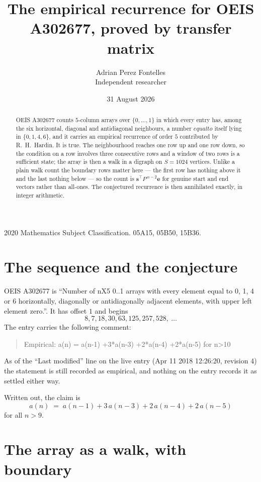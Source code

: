 \documentclass[11pt,a4paper]{article}
\title{The empirical recurrence for OEIS A302677, proved by transfer matrix}
\author{Adrian Perez Fontelles\\ \small Independent researcher}
\date{31 August 2026}
\theoremstyle{plain}
\theoremstyle{definition}
\begin{document}
\maketitle

\begin{abstract}
OEIS A302677 counts $5$-column arrays over $\{0,\dots,1\}$ in which every entry has,
among the six horizontal, diagonal and antidiagonal neighbours, a number $equal to$ itself lying in $\{0,1,4,6\}$, and it carries an empirical
recurrence of order $5$ contributed by R.~H.~Hardin. It is true. The neighbourhood
reaches one row up and one row down, so the condition on a row involves three consecutive
rows and a window of two rows is a sufficient state; the array is then a walk in a digraph
on $S=1024$ vertices. Unlike a plain walk count the boundary rows matter here --- the first
row has nothing above it and the last nothing below --- so the count is
$\mathbf{s}^{\!\top}P^{\,n-2}\mathbf{e}$ for genuine start and end vectors rather than
all-ones. The conjectured recurrence is then annihilated exactly, in integer arithmetic.
\end{abstract}

\noindent\small 2020 Mathematics Subject Classification. 05A15, 05B50, 15B36.\normalsize

\section{The sequence and the conjecture}

OEIS A302677 is ``Number of nX5 0..1 arrays with every element equal to 0, 1, 4 or 6 horizontally, diagonally or antidiagonally adjacent elements, with upper left element zero.''. It has offset
$1$ and begins
\[
8, 7, 18, 30, 63, 125, 257, 528,\ \dots
\]
The entry carries the following comment:
\begin{quote}\small
Empirical: a(n) = a(n-1) +3*a(n-3) +2*a(n-4) +2*a(n-5) for n>10
\end{quote}
As of the ``Last modified'' line on the live entry (Apr 11 2018 12:26:20, revision
4) the statement is still recorded as empirical, and nothing on the entry
records it as settled either way.

Written out, the claim is
\begin{equation}\label{eq:conj}
a(n)\;=\;a(n-1) + 3\,a(n-3) + 2\,a(n-4) + 2\,a(n-5)
\end{equation}
for all $n>9$.

\section{The array as a walk, with boundary}
\end{document}
